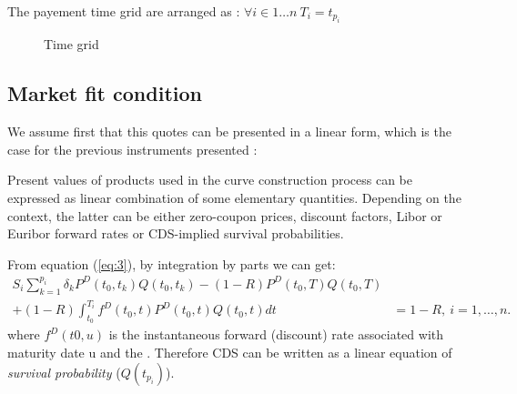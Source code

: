 The payement time grid are arranged as : $\forall i \in 1 \dots n\ T_i=t_{p_i}$
\begin{figure}[H]
  \centering
  \caption{Time grid }
  \label{fig:3}
\end{figure}

\subsection{Market fit condition}
\label{sec:market-fit-condition}
We assume first that this quotes can be presented in a linear form, which is the
case for the previous instruments presented :
\begin{assumption}
  \label{ass:1}
  Present values of products used in the curve construction process can be expressed as linear combination of some elementary quantities. Depending on the context, the latter can be either zero-coupon prices, discount factors, Libor or Euribor forward rates or CDS-implied survival probabilities.
\end{assumption}
\begin{example}
  From equation (\ref{eq:3}), by integration by parts we can get:
  \begin{eqnarray*}
    \label{eq:2}
    S_i \sum^{p_i}_{k=1}\delta_kP^D(t_0,t_k)Q(t_0,t_k) - (1 -
    R)P^D(t_0,T)Q(t_0,T) & \\
    + (1 - R)\int^{T_i}_{t_0}f^D(t_0,t)P^D(t_0,t)Q(t_0,t)dt & = 1 - R,\ i=1,\dots,n.
  \end{eqnarray*}
  where $f^D(t0, u)$ is the instantaneous forward (discount) rate associated with
  maturity date u and the . Therefore CDS can be written as a linear equation of
  {\it survival probability} ($Q(t_{p_i})$).
\end{example}

